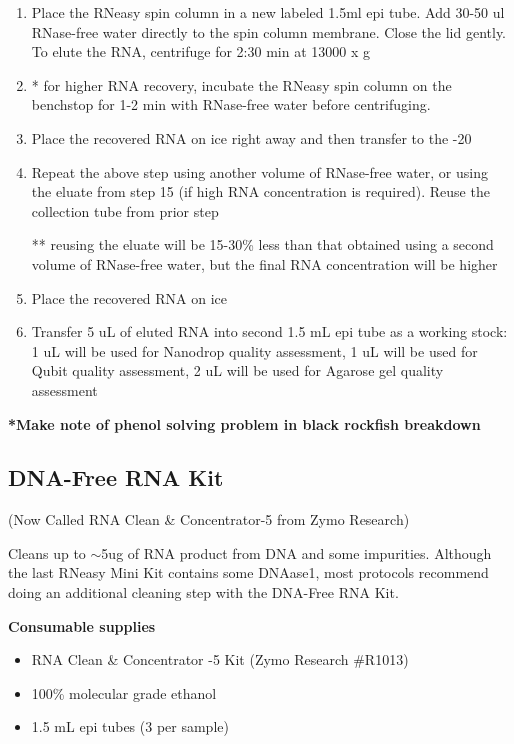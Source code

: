 \documentclass[11pt, oneside]{article}
\begin{document}
\begin{enumerate}
			\item Place the RNeasy spin column in a new labeled 1.5ml epi tube. Add 30-50 ul RNase-free water directly to the spin column membrane. 			Close the lid gently. To elute the RNA, centrifuge for 2:30 min at 13000 x g
			\item * for higher RNA recovery, incubate the RNeasy spin column on the benchstop for 1-2 min with RNase-free water before centrifuging.
			\item Place the recovered RNA on ice right away and then transfer to the -20
			\item Repeat the above step using another volume of RNase-free water, or using the eluate from step 15 (if high RNA concentration is 				required). Reuse the collection tube from prior step
			
			** reusing the eluate will be 15-30\% less than that obtained using a second volume of RNase-free water, but the final RNA concentration 				will be higher
			
			\item Place the recovered RNA on ice
			\item Transfer 5 uL of eluted RNA into second 1.5 mL epi tube as a working stock: 1 uL will be used for Nanodrop quality assessment, 1 uL 			will be used for Qubit quality assessment, 2 uL will be used for Agarose gel quality assessment
		\end{enumerate}
			
		{\bf**Make note of phenol solving problem in black rockfish breakdown}
		
	\newpage
		
		
	\subsection{DNA-Free RNA Kit}
		
		\noindent (Now Called RNA Clean \& Concentrator-5 from Zymo Research)
		
		\vspace{3mm}
		
		\noindent Cleans up to $\sim$5ug of RNA product from DNA and some impurities. Although the last RNeasy Mini Kit contains some DNAase1, 			most protocols recommend doing an additional cleaning step with the DNA-Free RNA Kit. 
		
		\vspace{5mm}
		
		{\bf Consumable supplies}
		
		\begin{itemize}
			\item RNA Clean \& Concentrator -5 Kit (Zymo Research \#R1013)
			\item 100\% molecular grade ethanol
			\item 1.5 mL epi tubes (3 per sample)
		\end{itemize}
		
\end{document}
